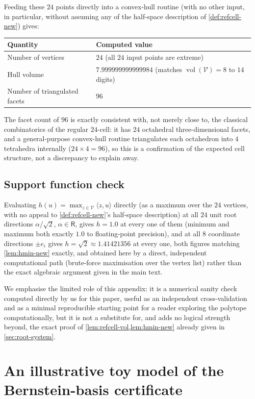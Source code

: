 \documentclass[11pt,reqno]{amsart}
\renewcommand{\_}{\origunderscore\allowbreak}
\numberwithin{equation}{section}
\theoremstyle{plain}
\theoremstyle{definition}
\theoremstyle{remark}
\newcommand{\Rt}{\mathsf{R}}                 %
\newcommand{\VCell}{\mathcal{V}}             %
\DeclareMathOperator{\vol}{vol}
\begin{document}
Feeding these $24$ points directly into a convex-hull routine (with no
other input, in particular, without assuming any of the half-space
description of \cref{def:refcell-new}) gives:
\begin{center}
\begin{tabular}{ll}
\toprule
Quantity & Computed value\\
\midrule
Number of vertices & $24$ (all $24$ input points are extreme)\\
Hull volume & $7.999999999999984$ (matches $\vol(\VCell)=8$ to $14$ digits)\\
Number of triangulated facets & $96$\\
\bottomrule
\end{tabular}
\end{center}
The facet count of $96$ is exactly consistent with, not merely close
to, the classical combinatorics of the regular $24$-cell: it has $24$
octahedral three-dimensional facets, and a general-purpose convex-hull
routine triangulates each octahedron into $4$ tetrahedra internally
($24\times4=96$), so this is a confirmation of the expected cell
structure, not a discrepancy to explain away.

\subsection*{Support function check}

Evaluating $h(u)=\max_{z\in\VCell}\langle z,u\rangle$ directly (as a
maximum over the $24$ vertices, with no appeal to
\cref{def:refcell-new}'s half-space description) at all $24$ unit root
directions $\alpha/\sqrt2$, $\alpha\in\Rt$, gives $h=1.0$ at every one of
them (minimum and maximum both exactly $1.0$ to floating-point
precision), and at all $8$ coordinate directions $\pm e_i$ gives
$h=\sqrt2\approx1.41421356$ at every one, both figures matching
\cref{lem:hmin-new} exactly, and obtained here by a direct, independent
computational path (brute-force maximisation over the vertex list)
rather than the exact algebraic argument given in the main text.

We emphasise the limited role of this appendix: it is a
numerical sanity check computed directly by us for this paper, useful
as an independent cross-validation and as a minimal reproducible
starting point for a reader exploring the polytope computationally, but
it is not a substitute for, and adds no logical strength beyond, 
the exact proof of \cref{lem:refcell-vol,lem:hmin-new} already given in
\cref{sec:root-system}.
\section{An illustrative toy model of the Bernstein-basis certificate}\label{app:bernstein-toy}
\end{document}
